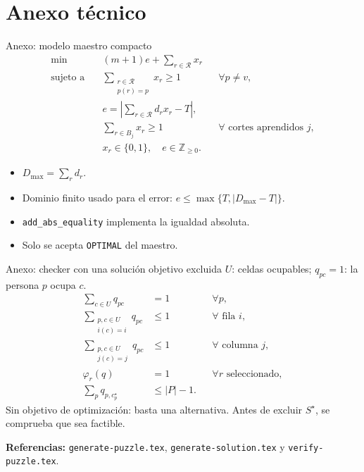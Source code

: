\documentclass[aspectratio=169,11pt]{beamer}
\begin{document}
\section{Anexo t\'ecnico}

\begin{frame}{Anexo: modelo maestro compacto}
  \small
  \[
    \begin{aligned}
      \min\quad &(m+1)e+\sum_{r\in\mathcal R}x_r\\
      \text{sujeto a}\quad
      &\sum_{\substack{r\in\mathcal R\\p(r)=p}}x_r\geq1
        &&\forall p\neq v,\\
      &e=\left|\sum_{r\in\mathcal R}d_rx_r-T\right|,\\
      &\sum_{r\in B_j}x_r\geq1
        &&\forall\text{ cortes aprendidos }j,\\
      &x_r\in\{0,1\},\quad e\in\mathbb Z_{\geq0}.
    \end{aligned}
  \]
  \begin{itemize}
    \item \(D_{\max}=\sum_r d_r\).
    \item Dominio finito usado para el error:
      \(e\leq\max\{T,|D_{\max}-T|\}\).
    \item \texttt{add\_abs\_equality} implementa la igualdad absoluta.
    \item Solo se acepta \texttt{OPTIMAL} del maestro.
  \end{itemize}
\end{frame}

\begin{frame}{Anexo: checker con una soluci\'on objetivo excluida}
  \small
  \(U\): celdas ocupables;\quad
  \(q_{pc}=1\): la persona \(p\) ocupa \(c\).
  \[
    \begin{aligned}
      \sum_{c\in U}q_{pc}&=1 &&\forall p,\\
      \sum_{\substack{p,c\in U\\i(c)=i}}q_{pc}&\leq1
        &&\forall\text{ fila }i,\\
      \sum_{\substack{p,c\in U\\j(c)=j}}q_{pc}&\leq1
        &&\forall\text{ columna }j,\\
      \varphi_r(q)&=1 &&\forall r\text{ seleccionado},\\
      \sum_p q_{p,c_p^\star}&\leq |P|-1.
    \end{aligned}
  \]
  Sin objetivo de optimizaci\'on: basta una alternativa.
  Antes de excluir \(S^\star\), se comprueba que sea factible.
  \par\medskip
  \textbf{Referencias:}
  \texttt{generate-puzzle.tex},
  \texttt{generate-solution.tex} y
  \texttt{verify-puzzle.tex}.
\end{frame}
\end{document}
